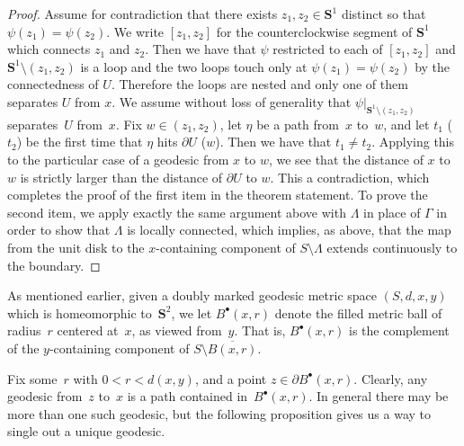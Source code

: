 \documentclass[10pt]{amsart}
\newcommand{\sbullet}{{\scriptscriptstyle\bullet}}
\theoremstyle{plain}
\numberwithin{theorem}{section}
\theoremstyle{definition}
\renewcommand{\S}{{\mathbf S}}
\let\ol\overline
\newcommand{\fb}[2]{B^\sbullet(#1,#2)}
\begin{document}
\begin{proof}
Assume for contradiction that there exists $z_1,z_2 \in \S^1$ distinct so that $\psi(z_1) = \psi(z_2)$. We write $[z_1,z_2]$ for the counterclockwise segment of $\S^1$ which connects $z_1$ and $z_2$. Then we have that $\psi$ restricted to each of $[z_1,z_2]$ and $\S^1 \setminus (z_1,z_2)$ is a loop and the two loops touch only at $\psi(z_1) = \psi(z_2)$ by the connectedness of $U$. Therefore the loops are nested and only one of them separates $U$ from $x$. We assume without loss of generality that $\psi|_{\S^1 \setminus (z_1,z_2)}$ separates~$U$ from~$x$. Fix $w \in (z_1,z_2)$, let $\eta$ be a path from~$x$ to~$w$, and let $t_1$ (\resp $t_2$) be the first time that $\eta$ hits $\partial U$ (\resp $w$). Then we have that $t_1 \neq t_2$. Applying this to the particular case of a geodesic from $x$ to $w$, we see that the distance of $x$ to $w$ is strictly larger than the distance of $\partial U$ to $w$. This a contradiction, which completes the proof of the first item in the theorem statement. To prove the second item, we apply exactly the same argument above with $\Lambda$ in place of $\Gamma$ in order to show that $\Lambda$ is locally connected, which implies, as above, that the map from the unit disk to the $x$-containing component of $S \setminus \Lambda$ extends continuously to the boundary.
\end{proof}

As mentioned earlier, given a doubly marked geodesic metric space $(S, d, x, y)$ which is homeomorphic to~$\S^2$, we let $\fb{x}{r}$ denote the filled metric ball of radius~$r$ centered at~$x$, as viewed from~$y$. That is, $\fb{x}{r}$ is the complement of the $y$-containing component of $S \setminus \ol{B(x,r)}$.

Fix some~$r$ with $0 < r < d(x,y)$, and a point $z \in \partial \fb{x}{r}$. Clearly, any geodesic from~$z$ to~$x$ is a path contained in~$\fb{x}{r}$. In general there may be more than one such geodesic, but the following proposition gives us a way to single out a unique geodesic.\vspace*{-5pt}\enlargethispage{\baselineskip}%
\end{document}
